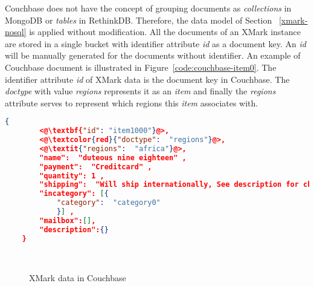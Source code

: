 Couchbase does not have the concept of grouping documents as \textit{collections} in MongoDB  or \textit{tables} in RethinkDB. 
Therefore, the data model of Section ~\ref{xmark-nosql} is applied without modification.
 All the documents of an XMark instance  are stored in a single bucket with identifier attribute \textit{id} as a document key. An \textit{id} will be manually generated for the documents without identifier.
An example of Couchbase document is illustrated in Figure~\ref{code:couchbase-item0}. The identifier attribute \textit{id}  of XMark data is the document key in Couchbase. The \textit{doctype} with  value \textit{regions} represents it as an \textit{item} and finally the \textit{regions} attribute serves to represent which regions this \textit{item} associates with. 
\newbox\cbXmarkDocument
\begin{lrbox}{\cbXmarkDocument}
\begin{lstlisting}[language=JSON,  basicstyle =\scriptsize]
    {
    	<@\textbf{"id": "item1000"}@>,
    	<@\textcolor{red}{"doctype":  "regions"}@>,
    	<@\textit{"regions":  "africa"}@>,
    	"name":  "duteous nine eighteen" ,
    	"payment":  "Creditcard" ,
    	"quantity": 1 ,
    	"shipping":  "Will ship internationally, See description for charges" ,
    	"incategory": [{
    		"category":  "category0"
    		}] ,
    	"mailbox":[],
    	"description":{}
    }
\end{lstlisting} 
\end{lrbox}


\newbox\cbXmarkChart
\begin{lrbox}{\cbXmarkChart}
\end{lrbox}

\begin{figure}[hbtp]
\centering
{}
\\
\centering
{}

\caption{XMark data in Couchbase}
\label{xmark-cb-figure}
\end{figure}